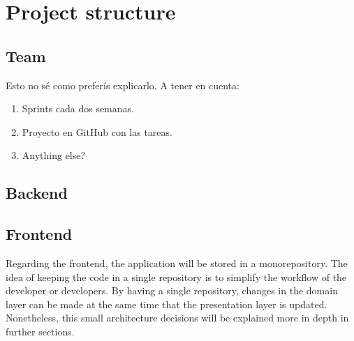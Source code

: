 \documentclass[../memory.tex]{subfiles}
\begin{document}
\chapter{Project structure}
\section{Team}
Esto no sé como preferís explicarlo. A tener en cuenta:
\begin{enumerate}[label = -]
  \item Sprints cada dos semanas.
  \item Proyecto en GitHub con las tareas.
  \item Anything else?
\end{enumerate}
\section{Backend}
\section{Frontend}
Regarding the frontend, the application will be stored in a monorepository. The
idea of keeping the code in a single repository is to simplify the workflow of
the developer or developers. By having a single repository, changes in the
domain layer can be made at the same time that the presentation layer is
updated. Nonetheless, this small architecture decisions will be explained more
in depth in further sections.
\end{document}
